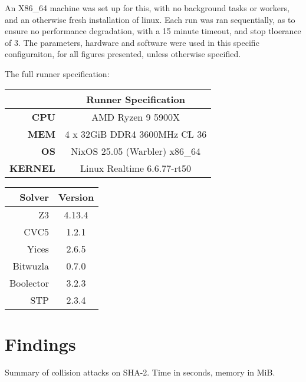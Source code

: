 \documentclass[a4paper]{report}
\begin{document}
An X86\_64 machine was set up for this, with no background tasks or workers, and an otherwise fresh installation of linux.
Each run was ran sequentially, as to ensure no performance degradation, with a 15 minute timeout, and stop tloerance of 3.
The parameters, hardware and software were used in this specific configuraiton, for all figures presented, unless otherwise specified.

The full runner specification:
\begin{center}
    \begin{tabular}{|r|c|}
        \hline
        & \textbf{Runner Specification} \\
        \hline
        \textbf{CPU} & AMD Ryzen 9 5900X \\
        \textbf{MEM} & 4 x 32GiB DDR4 3600MHz CL 36 \\
        \textbf{OS} & NixOS 25.05 (Warbler) x86\_64 \\
        \textbf{KERNEL} & Linux Realtime 6.6.77-rt50 \\
        \hline
    \end{tabular}
\end{center}

\begin{center}
    \begin{tabular}{|r|c|}
        \hline
        \textbf{Solver} & \textbf{Version} \\
        \hline
        Z3 & 4.13.4 \\
        CVC5 & 1.2.1 \\
        Yices & 2.6.5 \\
        Bitwuzla & 0.7.0 \\
        Boolector & 3.2.3 \\
        STP & 2.3.4 \\
        \hline
    \end{tabular}
\end{center}


\section{Findings}
Summary of collision attacks on SHA-2.
Time in seconds, memory in MiB.
\end{document}
